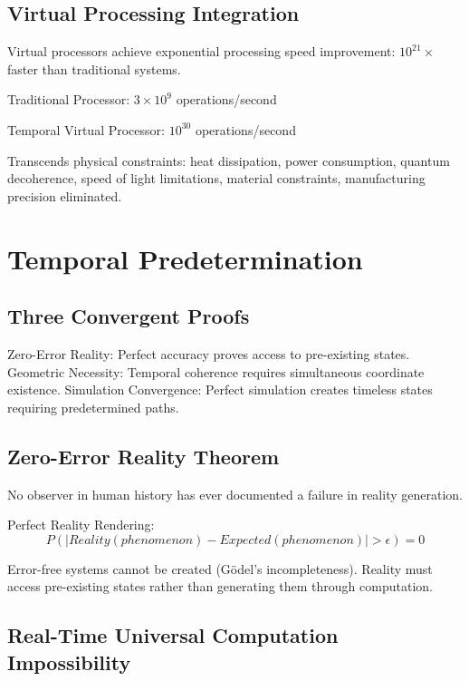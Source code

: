 \documentclass[12pt,a4paper]{article}
\begin{document}
\subsection{Virtual Processing Integration}

Virtual processors achieve exponential processing speed improvement: $10^{21}\times$ faster than traditional systems.

Traditional Processor: $3 \times 10^9$ operations/second

Temporal Virtual Processor: $10^{30}$ operations/second

Transcends physical constraints: heat dissipation, power consumption, quantum decoherence, speed of light limitations, material constraints, manufacturing precision eliminated.

\section{Temporal Predetermination}

\subsection{Three Convergent Proofs}

Zero-Error Reality: Perfect accuracy proves access to pre-existing states.
Geometric Necessity: Temporal coherence requires simultaneous coordinate existence.
Simulation Convergence: Perfect simulation creates timeless states requiring predetermined paths.

\subsection{Zero-Error Reality Theorem}

No observer in human history has ever documented a failure in reality generation.

Perfect Reality Rendering:
\begin{equation}
P(|Reality(phenomenon) - Expected(phenomenon)| > \epsilon) = 0
\end{equation}

Error-free systems cannot be created (Gödel's incompleteness). Reality must access pre-existing states rather than generating them through computation.

\subsection{Real-Time Universal Computation Impossibility}
\end{document}
